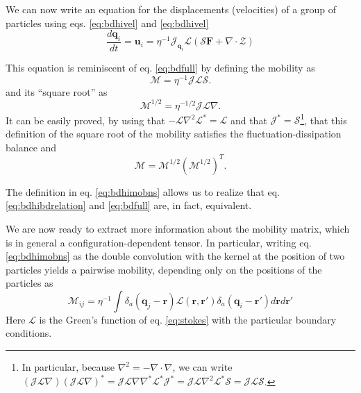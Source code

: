 \documentclass[ twoside,openright,titlepage,numbers=noenddot,%
headinclude,footinclude,cleardoublepage=empty,abstract=on,
BCOR=5mm,paper=a4,fontsize=11pt, dvipsnames
]{scrreprt}
\renewcommand{\vec}[1]{\bm{#1}}
\newcommand{\tens}[1]{\bm{\mathcal{#1}}}
\newcommand{\oper}[1]{\mathcal{#1}}
\newcommand{\kT}{k_B T}
\newcommand{\ppos}{q}
\begin{document}
We can now write an equation for the displacements (velocities) of a group of particles using eqs. \eqref{eq:bdhivel} and \eqref{eq:bdhivel}
\begin{equation}
  \label{eq:bdhibdrelation}
  \frac{d\vec{q}_i}{dt} = \vec{u}_i = \eta^{-1}\oper{J}_{\vec{\ppos}_i}\oper{L}(\oper{S}\vec{F} + \nabla\cdot\mathcal Z)
\end{equation}

This equation is reminiscent of eq. \eqref{eq:bdfull} by defining the mobility as
\begin{equation}
  \label{eq:bdhimobns}
  \tens{M} = \eta^{-1}\oper{J}\oper{L}\oper{S}.
\end{equation}
and its ``square root'' as
\begin{equation}
  \tens{M}^{1/2} = \eta^{-1/2}\oper{J}\oper{L}\nabla.
\end{equation}
It can be easily proved, by using that $-\oper{L}\nabla^2\oper{L}^* = \oper{L}$ and that $\oper{J}^*=\oper{S}$\cite{Delong2014}\footnote{In particular, because $\nabla^2 = -\nabla\cdot\nabla$, we can write $\left(\oper{J}\oper{L}\nabla\right)\left(\oper{J}\oper{L}\nabla\right)^* = \oper{J}\oper{L}\nabla\nabla^*\oper{L}^*\oper{J}^* = \oper{J}\oper{L}\nabla^2\oper{L}^*\oper{S} = \oper{J}\oper{L}\oper{S}$.}, that this definition of the square root of the mobility satisfies the fluctuation-dissipation balance and
\begin{equation}
  \label{eq:mobsqrt}
  \tens{M} = \tens{M}^{1/2}\left(\tens{M}^{1/2}\right)^T.
\end{equation}

The definition in eq. \ref{eq:bdhimobns} allows us to realize that eq. \eqref{eq:bdhibdrelation} and \eqref{eq:bdfull} are, in fact, equivalent.

We are now ready to extract more information about the mobility matrix, which is in general a configuration-dependent tensor. In particular, writing eq. \eqref{eq:bdhimobns} as the double convolution with the kernel at the position of two particles yields a pairwise mobility, depending only on the positions of the particles as
\begin{equation}
  \label{eq:bdhimob}
  \tens{M}_{ij} = \eta^{-1}\int{\delta_a(\vec{q}_j-\vec{r})\oper{L}(\vec{r}, \vec{r}')\delta_a(\vec{q}_i -\vec{r}')d\vec{r}d\vec{r}'}
\end{equation}
Here $\oper{L}$ is the Green's function of eq. \eqref{eq:stokes} with the particular boundary conditions.
\end{document}
